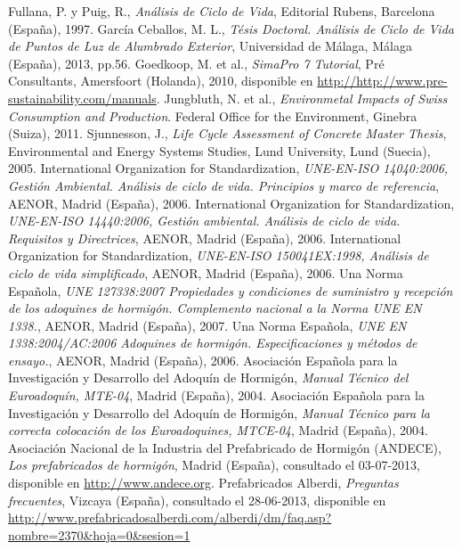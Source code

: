 % 
\begin{thebibliography}{100}
Fullana, P. y Puig, R., \emph{Análisis de Ciclo de Vida}, Editorial Rubens, Barcelona (España), 1997.
García Ceballos, M. L., \emph{Tésis Doctoral. Análisis de Ciclo de Vida de Puntos de Luz de Alumbrado Exterior}, Universidad de Málaga, Málaga (España), 2013, pp.56.
Goedkoop, M. et al., \emph{SimaPro 7 Tutorial}, Pré Consultants, Amersfoort (Holanda), 2010, disponible en \url{http://http://www.pre-sustainability.com/manuals}.
Jungbluth, N. et al., \emph{Environmetal Impacts of Swiss Consumption and Production}. Federal Office for the Environment, Ginebra (Suiza), 2011.
Sjunnesson, J., \emph{Life Cycle Assessment of Concrete Master Thesis}, Environmental and Energy Systems Studies, Lund University, Lund (Suecia), 2005.
International Organization for Standardization, \emph{UNE-EN-ISO 14040:2006, Gestión Ambiental. Análisis de ciclo de vida. Principios y marco de referencia}, AENOR, Madrid (España), 2006.
International Organization for Standardization, \emph{UNE-EN-ISO 14440:2006, Gestión ambiental. Análisis de ciclo de vida. Requisitos y Directrices}, AENOR, Madrid (España), 2006.
International Organization for Standardization, \emph{UNE-EN-ISO 150041EX:1998, Análisis de ciclo de vida simplificado}, AENOR, Madrid (España), 2006.
Una Norma Española, \emph{UNE 127338:2007 Propiedades y condiciones de suministro y recepción de los adoquines de hormigón.
Complemento nacional a la Norma UNE EN 1338.}, AENOR, Madrid (España), 2007.
Una Norma Española, \emph{UNE EN 1338:2004/AC:2006 Adoquines de hormigón. Especificaciones y métodos de ensayo.}, AENOR, Madrid (España), 2006.
Asociación Española para la Investigación y Desarrollo del Adoquín de Hormigón, \emph{Manual Técnico del Euroadoquín, MTE-04}, Madrid (España), 2004.
Asociación Española para la Investigación y Desarrollo del Adoquín de Hormigón, \emph{Manual Técnico para la correcta colocación de los Euroadoquines, MTCE-04}, Madrid (España), 2004.
Asociación Nacional de la Industria del Prefabricado de Hormigón (ANDECE), \emph{Los prefabricados de hormigón}, Madrid (España), consultado el 03-07-2013, disponible en \url{http://www.andece.org}.
Prefabricados Alberdi, \emph{Preguntas frecuentes}, Vizcaya (España), consultado el 28-06-2013, disponible en \url{http://www.prefabricadosalberdi.com/alberdi/dm/faq.asp?nombre=2370&hoja=0&sesion=1}
\end{thebibliography}

